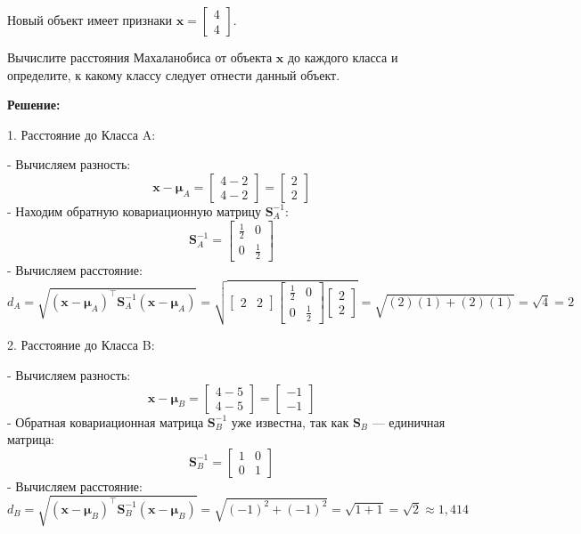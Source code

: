Новый объект имеет признаки \( \mathbf{x} = \begin{bmatrix} 4 \\ 4 \end{bmatrix} \).

Вычислите расстояния Махаланобиса от объекта \( \mathbf{x} \) до каждого класса и определите, к какому классу следует отнести данный объект.

\textbf{Решение:}

1. Расстояние до Класса A:

- Вычисляем разность:
  \[
  \mathbf{x} - \mathbf{\mu}_A = \begin{bmatrix} 4 - 2 \\ 4 - 2 \end{bmatrix} = \begin{bmatrix} 2 \\ 2 \end{bmatrix}
  \]
- Находим обратную ковариационную матрицу \( \mathbf{S}_A^{-1} \):
  \[
  \mathbf{S}_A^{-1} = \begin{bmatrix} \frac{1}{2} & 0 \\ 0 & \frac{1}{2} \end{bmatrix}
  \]
- Вычисляем расстояние:
  \[
  d_A = \sqrt{ (\mathbf{x} - \mathbf{\mu}_A)^\top \mathbf{S}_A^{-1} (\mathbf{x} - \mathbf{\mu}_A) } = \sqrt{ \begin{bmatrix} 2 & 2 \end{bmatrix} \begin{bmatrix} \frac{1}{2} & 0 \\ 0 & \frac{1}{2} \end{bmatrix} \begin{bmatrix} 2 \\ 2 \end{bmatrix} } = \sqrt{ (2)(1) + (2)(1) } = \sqrt{4} = 2
  \]

2. Расстояние до Класса B:

- Вычисляем разность:
  \[
  \mathbf{x} - \mathbf{\mu}_B = \begin{bmatrix} 4 - 5 \\ 4 - 5 \end{bmatrix} = \begin{bmatrix} -1 \\ -1 \end{bmatrix}
  \]
- Обратная ковариационная матрица \( \mathbf{S}_B^{-1} \) уже известна, так как \( \mathbf{S}_B \) — единичная матрица:
  \[
  \mathbf{S}_B^{-1} = \begin{bmatrix} 1 & 0 \\ 0 & 1 \end{bmatrix}
  \]
- Вычисляем расстояние:
  \[
  d_B = \sqrt{ (\mathbf{x} - \mathbf{\mu}_B)^\top \mathbf{S}_B^{-1} (\mathbf{x} - \mathbf{\mu}_B) } = \sqrt{ (-1)^2 + (-1)^2 } = \sqrt{1 + 1} = \sqrt{2} \approx 1{,}414
  \]

